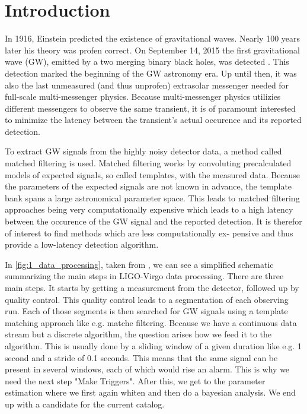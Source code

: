 

\section{Introduction}
In 1916, Einstein predicted the existence of gravitational waves. Nearly 100
years later his theory was profen correct. On September 14, 2015 the first 
gravitational wave (GW), emitted by a
two merging binary black holes, was detected \cite{PhysRevLett.116.061102}.
This detection marked the beginning
of the GW astronomy era. Up until then, it was also the last unmeasured (and thus
unprofen) extrasolar messenger needed for full-scale multi-messenger physics.
\cite{Branchesi_2016} Because multi-messenger physics utilizies different 
messengers to observe the same transient, it is of paramount interested to 
minimize the latency between the transient's actual occurence and its reported
detection.

To extract GW signals from the highly noisy detector data, a method called
matched filtering is used. Matched filtering works by convoluting precalculated
models of expected signals, so called templates, with the measured data.
Because the parameters of the expected signals are not known in advance, the
template bank spans a large astronomical parameter space. This leads to
matched filtering approaches being very computationally expensive which leads
to a high latency between the occurence of the GW signal and the reported
detection. It is therefor of interest to find methods which are less computationally ex-
pensive and thus provide a low-latency detection algorithm.

In \autoref{fig:1_data_processing}, taken from \cite{2020CQGra..37e5002A},
we can see a simplified schematic summarizing
the main steps in LIGO-Virgo data processing. There are three main steps. It
starts by getting a measurement from the detector, followed up by quality
control. This quality control leads to a segmentation of each observing run.
Each of those segments is then searched for GW signals using a template matching
approach like e.g. matche filtering. Because we have a continuous data stream
but a discrete algorithm, the question arises how we feed it to the algorithm.
This is usually done by a sliding window of a given duration like e.g. 1 second
and a stride of 0.1 seconds. This means that the same signal can be present in
several windows, each of which would rise an alarm. This is why we need the next
step "Make Triggers". After this, we get
to the parameter estimation where we first again whiten and then do a bayesian
analysis. We end up with a candidate for the current catalog.

